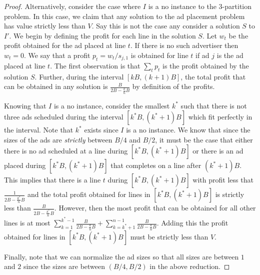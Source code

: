 \begin{proof}
Alternatively, consider the case where $I$ is a no instance to the $3$-partition problem.  In this case,  we claim that any solution to the ad placement problem has value strictly less than $V$.  Say this is not the case any consider a solution $S$ to $I'$.   We begin by defining the profit for each line in the solution $S$.  Let $w_t$ be the profit obtained for the ad placed at line $t$.  If there is no such advertiser then $w_t = 0$.  We say that a profit $p_t = w_t /s_{j,1}$ is obtained for line $t$ if ad $j$ is the ad placed at line $t$. The first observation is that $\sum_t p_t$ is the profit obtained by the solution $S$. Further, during the interval $[kB,(k+1)B]$, the total profit that can be obtained in any solution is $\frac{B}{2B-\frac{k}{n}B}$ by definition of the profits.

Knowing that $I$ is a no instance, consider the smallest $k^*$ such that there is not three ads scheduled during the interval $[k^*B,(k^*+1)B]$ which fit perfectly in the interval.  Note that $k^*$ exists since $I$ is a no instance. We know that since the sizes of the ads are \emph{strictly} between $B/4$ and $B/2$, it must be the case that either there is no ad scheduled at a line during $[k^*B,(k^*+1)B]$ or there is an ad placed during $[k^*B,(k^*+1)B]$ that completes on a line after $(k^*+1)B$.  This implies that there is a line $t$ during $[k^*B,(k^*+1)B]$ with profit less that $\frac{1}{2B-\frac{k^*}{n}B}$ and the total profit obtained for lines in  $[k^*B,(k^*+1)B]$  is strictly less than $\frac{B}{2B-\frac{k^*}{n}B}$. However, then the most profit that can be obtained for all other lines is at most $\sum_{k=1}^{k^*-1}\frac{B}{2B-\frac{k}{n}B}  + \sum_{k=k^*+1}^{n-1}\frac{B}{2B-\frac{k}{n}B}  $.  Adding this the profit obtained for lines in $[k^*B,(k^*+1)B]$ must be strictly less than $V$.

Finally, note that we can normalize the ad sizes so that all sizes are between $1$ and $2$ since the sizes are between $(B/4,B/2)$ in the above reduction.

\end{proof}

